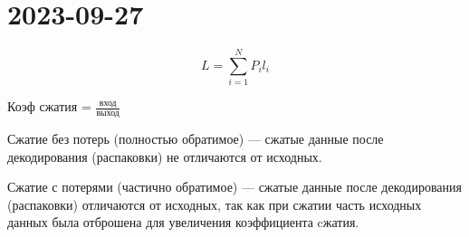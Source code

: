 \section{2023-09-27}

\[
	L = \sum_{i=1}^{N} P_i l_i
\]

Коэф сжатия = $\frac{\text{вход} }{\text{выход} }$ 

Сжатие без потерь (полностью обратимое) — сжатые данные после декодирования (распаковки) не отличаются от исходных.

Сжатие с потерями (частично обратимое) — сжатые данные после декодирования (распаковки) отличаются от исходных, так как при сжатии часть исходных данных была отброшена для увеличения коэффициента cжатия.
